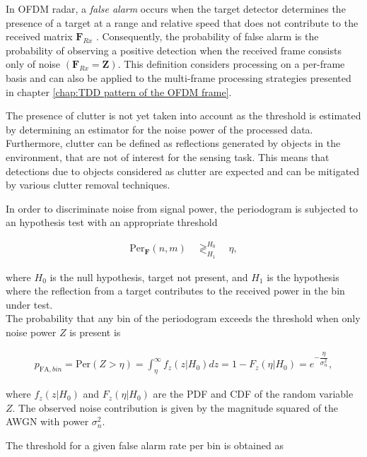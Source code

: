 				
				In OFDM radar, a \textit{false alarm} occurs when the target detector determines the presence of a target at a range and relative speed that does not contribute to the received matrix $\bm{F}_{Rx}$ \cite{Braun2014OFDMRA}. 
				Consequently, the probability of false alarm is the probability of observing a positive detection when the received frame consists only of noise $(\bm{F}_{Rx} = \bm{Z})$. 
				This definition considers processing on a per-frame basis and can also be applied to the multi-frame processing strategies presented in chapter \ref{chap:TDD pattern of the OFDM frame}. 
				
				The presence of clutter is not yet taken into account as the threshold is estimated by determining an estimator for the noise power of the processed data. 
				Furthermore, clutter can be defined as reflections generated by objects in the environment, that are not of interest for the sensing task. 
				This means that detections due to objects considered as clutter are expected and can be mitigated by various clutter removal techniques.
				
				In order to discriminate noise from signal power, the periodogram is subjected to an hypothesis test with an appropriate threshold
				
				\begin{align*}
					\text{Per}_{\bm{F}}(n,m) \quad\mathop{\gtrless}_{H_1}^{H_0}  \quad \eta,
				\end{align*}
				
				where $H_0$ is the null hypothesis, target not present, and $H_1$ is the hypothesis where the reflection from a target contributes to the received power in the bin under test.\\
				The probability that any bin of the periodogram exceeds the threshold when only noise power $Z$ is present is
				
				\begin{align*}
					p_{\text{FA},bin} = \text{Per}(Z > \eta) = \int_\eta^{\infty} f_z(z|H_0)dz = 1 - F_z(\eta | H_0) = e^{-\dfrac{\eta}{\sigma_n^2}},
				\end{align*}
				 
				where $f_z(z|H_0)$ and $F_z(\eta | H_0)$ are the PDF and CDF of the random variable $Z$. 
				The observed noise contribution is given by the magnitude squared of the AWGN with power $\sigma_n^2$.
				 
				The threshold for a given false alarm rate per bin is obtained as
				
